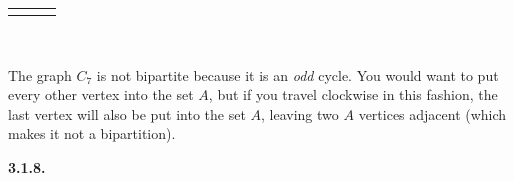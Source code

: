 \documentclass[10pt,]{book}
\theoremstyle{plain}
\theoremstyle{definition}
\theoremstyle{definition}
\theoremstyle{definition}
\theoremstyle{definition}
\numberwithin{equation}{chapter}
\newlength{\panelmax}
\begin{document}
{\settototalheight{\phCimage}{\usebox{\panelboxCimage}}
\setlength{\panelmax}{\maxof{\panelmax}{\phCimage}}
\leavevmode%
\setlength{\tabcolsep}{0.0616666666666665\linewidth}
\par\medskip\noindent
\hspace*{0.0616666666666667\linewidth}%
\begin{tabular}{@{}*{3}{c}@{}}
\begin{minipage}[c][\panelmax][c]{0.2\linewidth}\usebox{\panelboxAimage}\end{minipage}&
\begin{minipage}[c][\panelmax][c]{0.23\linewidth}\usebox{\panelboxBimage}\end{minipage}&
\begin{minipage}[c][\panelmax][c]{0.2\linewidth}\usebox{\panelboxCimage}\end{minipage}\end{tabular}\\
}%
\par
\hypertarget{p-1575}{}%
The graph \(C_7\) is not bipartite because it is an \emph{odd} cycle.  You would want to put every other vertex into the set \(A\), but if you travel clockwise in this fashion, the last vertex will also be put into the set \(A\), leaving two \(A\) vertices adjacent (which makes it not a bipartition).%
\par\smallskip
\noindent\textbf{3.1.8.} \hypertarget{p-1582}{}%
\leavevmode%
\end{document}
